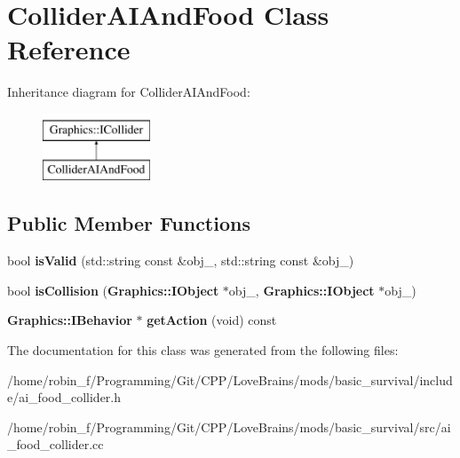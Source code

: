 \section{Collider\+A\+I\+And\+Food Class Reference}
\label{class_collider_a_i_and_food}
Inheritance diagram for Collider\+A\+I\+And\+Food\+:\begin{figure}[H]
\begin{center}
\leavevmode
\includegraphics[height=2.000000cm]{class_collider_a_i_and_food}
\end{center}
\end{figure}
\subsection*{Public Member Functions}
\begin{DoxyCompactItemize}
\item 
bool {\bfseries is\+Valid} (std\+::string const \&obj\+\_, std\+::string const \&obj\+\_)\label{class_collider_a_i_and_food_a5539e8ede36c8925761c9b38d72bb2f8}

\item 
bool {\bfseries is\+Collision} ({\bf Graphics\+::\+I\+Object} $\ast$obj\+\_, {\bf Graphics\+::\+I\+Object} $\ast$obj\+\_)\label{class_collider_a_i_and_food_a02da3d9f13b0266fd90e5d48ed0afb26}

\item 
{\bf Graphics\+::\+I\+Behavior} $\ast$ {\bfseries get\+Action} (void) const \label{class_collider_a_i_and_food_acdc9999cbb29add55cbeb09af00fa422}

\end{DoxyCompactItemize}


The documentation for this class was generated from the following files\+:\begin{DoxyCompactItemize}
\item 
/home/robin\+\_\+f/\+Programming/\+Git/\+C\+P\+P/\+Love\+Brains/mods/basic\+\_\+survival/include/ai\+\_\+food\+\_\+collider.\+h\item 
/home/robin\+\_\+f/\+Programming/\+Git/\+C\+P\+P/\+Love\+Brains/mods/basic\+\_\+survival/src/ai\+\_\+food\+\_\+collider.\+cc\end{DoxyCompactItemize}
